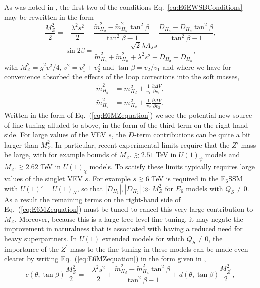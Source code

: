 \documentclass[preprint,amsmath,amssymb,aps,superscriptaddress,prd,
showpacs,floatfix,nofootinbib]{revtex4-1}
\begin{document}
As was noted in \cite{Athron:2013ipa}, the first two of the conditions
Eq.~\ref{eq:E6EWSBConditions} may be rewritten in the form
\begin{equation} \label{eq:E6MZequation}
\frac{M_Z^2}{2} = -\frac{\lambda^2 s^2}{2} + \frac{\tilde{m}_{H_d}^2 -
\tilde{m}_{H_u}^2 \tan^2\beta}{\tan^2\beta - 1} +
\frac{D_{H_d} - D_{H_u} \tan^2\beta}{\tan^2\beta - 1} ,
\end{equation}
\begin{equation} \label{eq:E6sin2bequation}
\sin 2\beta = \frac{\sqrt{2} \lambda A_{\lambda} s}
{\tilde{m}_{H_d}^2 + \tilde{m}_{H_u}^2 + \lambda^2 s^2 + D_{H_d} + D_{H_u}} ,
\end{equation}
with $M_Z^2 = \bar{g}^2 v^2 / 4$, $v^2 = v_1^2 + v_2^2$ and $\tan\beta =
v_2 / v_1$ and where we have for convenience absorbed the effects of the
loop corrections into the soft masses,
\begin{align*}
\tilde{m}_{H_d}^2 &= m_{H_d}^2 + \frac{1}{v_1} \frac{\partial \Delta V}
{\partial v_1} , \\
\tilde{m}_{H_u}^2 &= m_{H_u}^2 + \frac{1}{v_2} \frac{\partial \Delta V}
{\partial v_2} .
\end{align*}
Written in the form of Eq.~(\ref{eq:E6MZequation}) we see the
potential new source of fine tuning alluded to above, in the form of
the third term on the right-hand side.  For large values of the VEV
$s$, the $D$-term contributions can be quite a bit larger than
$M_Z^2$.  In particular, recent experimental limits \cite{Aad:2014cka}
require that the $Z'$ mass be large, with for example bounds of
$M_{Z'} \gtrsim 2.51$ TeV in $U(1)_\psi$ models and $M_{Z'} \gtrsim 2.62$ TeV
in $U(1)_\chi$ models.  To satisfy these limits typically requires large
values of the singlet VEV $s$.  For example $s \gtrsim 6$ TeV is required in
the E$_6$SSM with $U(1)' = U(1)_N$, so that $|D_{H_1}| , |D_{H_2}| \gg M_Z^2$
for $E_6$ models with $Q_S \neq 0$.  As a result the remaining terms on the
right-hand side of Eq.~(\ref{eq:E6MZequation}) must be tuned to cancel
this very large contribution to $M_Z$.  Moreover, because this is a large tree
level fine tuning, it may negate the improvement in naturalness that is
associated with having a reduced need for heavy superpartners.  In $U(1)$
extended models for which $Q_S\neq 0$, the importance of the $Z^\prime$ mass
to the fine tuning in these models can be made even clearer by writing
Eq.~(\ref{eq:E6MZequation}) in the form given in \cite{Athron:2013ipa},
\begin{equation}\label{eq:originalE6MZequation}
c(\theta , \tan\beta) \frac{M_Z^2}{2} = -\frac{\lambda^2 s^2}{2} +
\frac{\tilde{m}_{H_d}^2 - \tilde{m}_{H_u}^2 \tan^2\beta}{\tan^2\beta - 1}
+ d(\theta , \tan\beta) \frac{M_{Z^\prime}^2}{2} ,
\end{equation}
\end{document}
